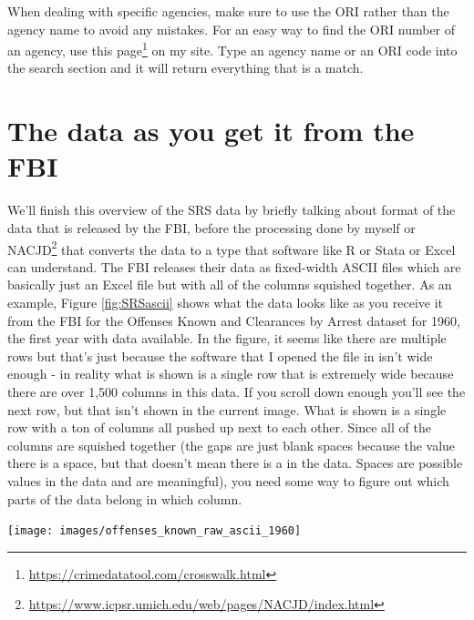 \documentclass[
]{krantz}
\let\origfigure\figure
\let\endorigfigure\endfigure
\renewenvironment{figure}[1][2] {
    \expandafter\origfigure\expandafter[H]
} {
    \endorigfigure
}
\renewcommand{\href}[2]{#2\footnote{\url{#1}}}
\begin{document}
When dealing with specific agencies, make sure to use the
ORI rather than the agency name to avoid any mistakes. For
an easy way to find the ORI number of an agency, use
\href{https://crimedatatool.com/crosswalk.html}{this page}
on my site. Type an agency name or an ORI code into the
search section and it will return everything that is a
match.

\section{The data as you get it from the
FBI}\label{the-data-as-you-get-it-from-the-fbi}

We'll finish this overview of the SRS data by briefly
talking about format of the data that is released by the
FBI, before the processing done by myself or
\href{https://www.icpsr.umich.edu/web/pages/NACJD/index.html}{NACJD}
that converts the data to a type that software like R or
Stata or Excel can understand. The FBI releases their data
as fixed-width ASCII files which are basically just an Excel
file but with all of the columns squished together. As an
example, Figure \ref{fig:SRSascii} shows what the data looks
like as you receive it from the FBI for the Offenses Known
and Clearances by Arrest dataset for 1960, the first year
with data available. In the figure, it seems like there are
multiple rows but that's just because the software that I
opened the file in isn't wide enough - in reality what is
shown is a single row that is extremely wide because there
are over 1,500 columns in this data. If you scroll down
enough you'll see the next row, but that isn't shown in the
current image. What is shown is a single row with a ton of
columns all pushed up next to each other. Since all of the
columns are squished together (the gaps are just blank
spaces because the value there is a space, but that doesn't
mean there is a in the data. Spaces are possible values in
the data and are meaningful), you need some way to figure
out which parts of the data belong in which column.

\begin{figure}

{\centering \texttt{[image: images/offenses\_known\_raw\_ascii\_1960]} 

}

\caption{Fixed-width ASCII file for the 1960 Offenses Known and Clearances by Arrest dataset.}\label{fig:SRSascii}
\end{figure}
\end{document}
